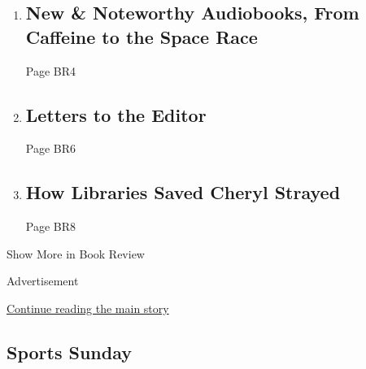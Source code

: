\begin{enumerate}
\def\labelenumi{\arabic{enumi}.}
\item
  \href{/2020/02/11/books/review/new-this-week.html}{}

  \hypertarget{new--noteworthy-audiobooks-from-caffeine-to-the-space-race}{%
  \subsection{New \& Noteworthy Audiobooks, From Caffeine to the Space
  Race}\label{new--noteworthy-audiobooks-from-caffeine-to-the-space-race}}

  Page BR4
\item
  \href{/2020/02/14/books/review/letters-to-the-editor.html}{}

  \hypertarget{letters-to-the-editor}{%
  \subsection{Letters to the Editor}\label{letters-to-the-editor}}

  Page BR6
\item
  \href{/2020/02/13/books/review/cheryl-strayed-by-the-book-interview.html}{}

  \hypertarget{how-libraries-saved-cheryl-strayed}{%
  \subsection{How Libraries Saved Cheryl
  Strayed}\label{how-libraries-saved-cheryl-strayed}}

  Page BR8
\end{enumerate}

Show More in Book Review

Advertisement

\protect\hyperlink{after-mid6}{Continue reading the main story}

\hypertarget{sports-sunday}{%
\subsection{Sports Sunday}\label{sports-sunday}}

